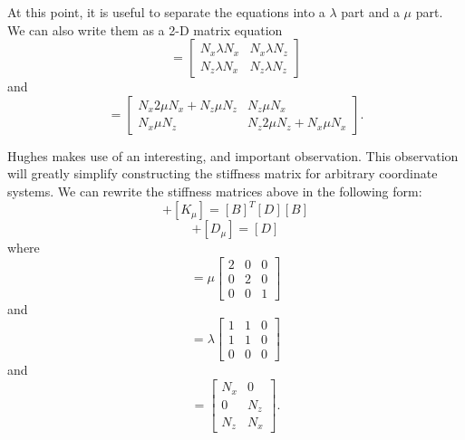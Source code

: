 \documentclass{article}
\begin{document}
At this point, it is useful to separate the equations into a $\lambda$ part and
a $\mu$ part.  We can also write them as a 2-D matrix equation
\begin{equation}  [K_{\lambda}] = \left[ 
\begin{array}{cc}
N_x \lambda N_x &  N_x \lambda N_z \\ 
N_z \lambda N_x &  N_z \lambda N_z 
\end{array} \right ] \label{eq:Klambda} 
\end{equation}
and
\begin{equation}  
[K_{\mu}] = \left[ 
\begin{array}{cc} 
N_x 2 \mu N_x + N_z \mu N_z &  N_z \mu N_x \\  
N_x \mu N_z                 &  N_z 2 \mu N_z + N_x \mu N_x
\end{array} \right ]. \label{eq:Kmu} 
\end{equation}

Hughes makes use of an interesting, and important observation.   This
observation will greatly simplify constructing the stiffness matrix for
arbitrary coordinate systems.  We can rewrite the stiffness matrices above in
the following form:
\begin{equation}  
[K_{\lambda}] + [K_{\mu}] = [B]^T [D] [B]
\end{equation}
\begin{equation}
[D_{\lambda}] + [D_{\mu}] = [D]
\end{equation}
where
\begin{equation}   
[D_{\mu}] = \mu \left[ 
\begin{array}{ccc}  
2 & 0 & 0 \\  
0 & 2 & 0 \\
0 & 0 & 1 
\end{array} \right ]
\end{equation}
and
\begin{equation}    
[D_{\lambda}] = \lambda \left[ 
\begin{array}{ccc}   
1 & 1 & 0 \\   
1 & 1 & 0 \\ 
0 & 0 & 0 
\end{array} \right ]
\end{equation}
and
\begin{equation}     
[B] = \left[ 
\begin{array}{cc}    
N_x & 0   \\    
0   & N_z \\
N_z & N_x 
\end{array} \right ].
\end{equation}
\end{document}
